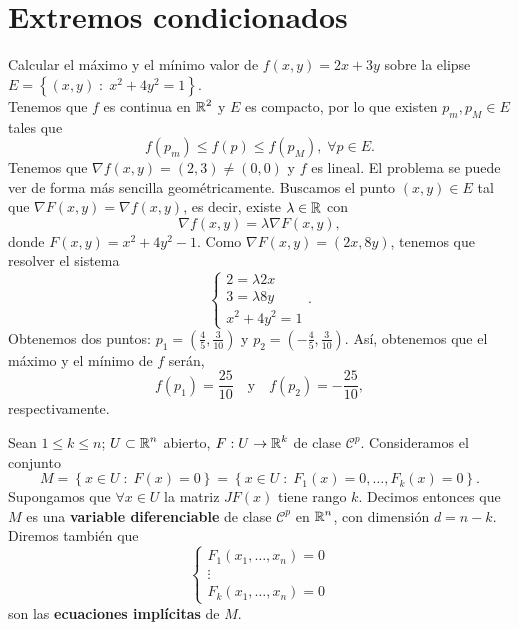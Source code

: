 \section{Extremos condicionados}
\begin{eg}
	Calcular el máximo y el mínimo valor de $\displaystyle f\left(x,y\right) = 2x+3y $ sobre la elipse $\displaystyle E = \left\{ \left(x,y\right) \; : \; x^{2}+4y^{2} = 1\right\}  $. \\
	Tenemos que $\displaystyle f $ es continua en $\displaystyle \mathbb{R}^{2} $ y $\displaystyle E $ es compacto, por lo que existen $\displaystyle p_{m}, p_{M} \in E $ tales que 
	\[f\left(p_{m} \right)\leq f\left(p\right) \leq f\left(p_{M}\right), \; \forall p \in E .\]
Tenemos que $\displaystyle \nabla f\left(x,y\right) = \left(2,3\right) \neq \left(0,0\right) $ y $\displaystyle f $ es lineal. El problema se puede ver de forma más sencilla geométricamente. Buscamos el punto $\displaystyle \left(x,y\right) \in E $ tal que $\displaystyle \nabla F\left(x,y\right) = \nabla f\left(x,y\right) $, es decir, existe $\displaystyle \lambda \in \mathbb{R} $ con 
\[\nabla f\left(x,y\right) = \lambda \nabla F\left(x,y\right) ,\]
donde $\displaystyle F\left(x,y\right) = x^{2}+4y^{2}-1 $. Como $\displaystyle \nabla F\left(x,y\right) = \left(2x,8y\right) $, tenemos que resolver el sistema
\[
\begin{cases}
2 = \lambda 2x \\ 
3 = \lambda 8y \\ 
x^{2}+4y^{2} = 1
\end{cases}
.\]
Obtenemos dos puntos: $\displaystyle p_{1} = \left(\frac{4}{5}, \frac{3}{10}\right) $ y $\displaystyle p_{2} = \left(-\frac{4}{5}, \frac{3}{10}\right) $. Así, obtenemos que el máximo y el mínimo de $\displaystyle f $ serán, 
\[f\left(p_{1}\right)=\frac{25}{10} \quad \text{y} \quad f\left(p_{2}\right) = -\frac{25}{10},\]
respectivamente. 
\end{eg}
\begin{definition}
	Sean $\displaystyle 1\leq k \leq n $; $\displaystyle U \subset \mathbb{R}^{n} $ abierto, $\displaystyle F : U \to \mathbb{R}^{k} $ de clase $\displaystyle \mathcal{C}^{p} $. Consideramos el conjunto 
	\[M = \left\{ x \in U \; : \; F\left(x\right) = 0\right\} = \left\{ x \in U \; : \; F_{1}\left(x\right) = 0, \ldots, F_{k}\left(x\right) = 0\right\}  .\]
Supongamos que $\displaystyle \forall x \in U $ la matriz $\displaystyle JF\left(x\right) $ tiene rango $\displaystyle k $. Decimos entonces que $\displaystyle M $ es una \textbf{variable diferenciable} de clase $\displaystyle \mathcal{C}^{p} $ en $\displaystyle \mathbb{R}^{n} $, con dimensión $\displaystyle d = n - k  $. Diremos también que 
\[
\begin{cases}
F_{1}\left(x_{1}, \ldots, x_{n}\right) = 0 \\
\vdots \\ 
F_{k}\left(x_{1}, \ldots, x_{n}\right) = 0
\end{cases}
\]
son las \textbf{ecuaciones implícitas} de $\displaystyle M $.
\end{definition}
